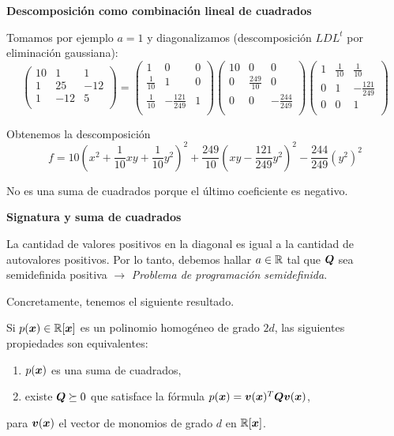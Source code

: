 \begin{example}
\textbf{Descomposición como combinación lineal de cuadrados}

Tomamos por ejemplo $a = 1$ y diagonalizamos (descomposici\'on $LDL^t$ por eliminaci\'on gaussiana):
{\scriptsize
\[
\begin{pmatrix}
10 & 1 & 1 \\
1 & 25 & -12 \\
1 & -12 & 5 \\
\end{pmatrix}
=
\begin{pmatrix}
1 & 0 & 0 \\
\frac{1}{10} & 1 & 0 \\
\frac{1}{10} & -\frac{121}{249} & 1 \\
\end{pmatrix}
\begin{pmatrix}
10 & 0 & 0 \\
0 & \frac{249}{10} & 0 \\
0 & 0 & -\frac{244}{249} \\
\end{pmatrix}
\begin{pmatrix}
1 & \frac{1}{10}  & \frac{1}{10}  \\
0 & 1 & -\frac{121}{249}  \\
0 & 0 & 1 \\
\end{pmatrix}
\]
}

Obtenemos la descomposici\'on
\[
f = 10\left(x^2+\frac{1}{10}xy+\frac{1}{10}y^2\right)^2 + \frac{249}{10}\left(xy-\frac{121}{249}y^2\right)^2 - \frac{244}{249}\left(y^2\right)^2
\]

No es una suma de cuadrados porque el último coeficiente es negativo.

\end{example}

\textbf{Signatura y suma de cuadrados}

La cantidad de valores positivos en la diagonal es igual a la cantidad de autovalores positivos.
Por lo tanto, debemos hallar $a \in \mathbb{R}$ tal que $\bm{Q}$ sea semidefinida positiva $\longrightarrow$ \emph{Problema de programaci\'on semidefinida}.

Concretamente, tenemos el siguiente resultado.

\begin{prop} Si $p(\bm{x}) \in \mathbb{R}[\bm{x}]$ es un polinomio homogéneo de grado $2d$, las siguientes propiedades son equivalentes:
\begin{enumerate}
\item $p(\bm{x})$ es una suma de cuadrados,
\item existe $\bm{Q} \succeq 0$ que satisface la fórmula $p(\bm{x}) = \bm{v}(\bm{x})^T \bm{Q} \bm{v}(\bm{x})$,
\end{enumerate}
para $\bm{v}(\bm{x})$ el vector de monomios de grado $d$ en $\mathbb{R}[\bm{x}]$.
\end{prop}

